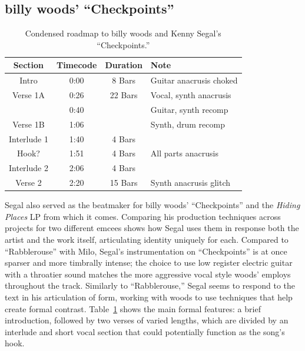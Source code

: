 \subsection*{\centering billy woods' ``Checkpoints''}

\begin{table}[ht]
    \centering
    \begin{tabular}{|c|c|c|l|}
        \hline
         Section      & Timecode & Duration & Note                          \\ \hline
         Intro        & 0:00     & 8 Bars   & Guitar anacrusis choked       \\ \hline
         Verse 1A     & 0:26     & 22 Bars  & Vocal, synth  anacrusis       \\ \hline
                      & 0:40     &          & Guitar, synth recomp          \\ \hline
         Verse 1B     & 1:06     &          & Synth, drum recomp            \\ \hline
         Interlude 1  & 1:40     & 4 Bars   &                               \\ \hline
         Hook?        & 1:51     & 4 Bars   & All parts anacrusis           \\ \hline
         Interlude 2  & 2:06     & 4 Bars   &                               \\ \hline
         Verse 2      & 2:20     & 15 Bars  & Synth anacrusis glitch        \\ \hline
         
    \end{tabular}
    \caption{Condensed roadmap to billy woods and Kenny Segal's ``Checkpoints.''}
    \label{tab:checkpoints}
\end{table}

Segal also served as the beatmaker for billy woods' ``Checkpoints'' and the \textit{Hiding Places} LP 
from which it comes. Comparing his production techniques across projects for two different emcees shows 
how Segal uses them in response both the artist and the work itself, articulating identity uniquely for 
each. Compared to ``Rabblerouse'' with Milo, Segal's instrumentation on ``Checkpoints'' is at once sparser
and more timbrally intense; the choice to use low register electric guitar with a throatier sound matches 
the more aggressive vocal style woods' employs throughout the track. Similarly to ``Rabblerouse,'' Segal
seems to respond to the text in his articulation of form, working with woods to use techniques that help
create formal contrast. Table~\ref{tab:checkpoints} shows the main formal features: a brief introduction,
followed by two verses of varied lengths, which are divided by an interlude and short vocal section that
could potentially function as the song's hook.

